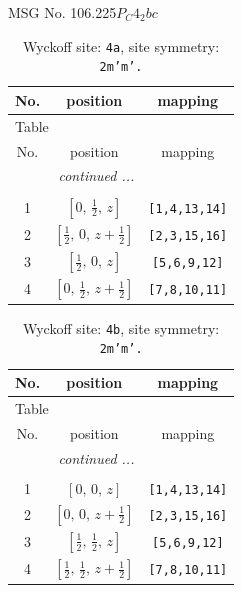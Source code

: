 \documentclass[fleqn,8pt]{jsarticle}
\begin{document}
\setcounter{MaxMatrixCols}{32}

\renewcommand{\tablename}{Table~}
\renewcommand{\figurename}{Figure~}
\begin{center}
\LARGE
MSG No. 106.225\quad$P_{C}4_{2}bc$
\end{center}
\renewcommand{\arraystretch}{1.2}
\begin{longtable}{ccc}
\caption{Wyckoff site: {\tt 4a}, site symmetry: {\tt 2m'm'.}}
 \\
 \hline \hline
No. & position & mapping \\ \hline \endfirsthead

\multicolumn{2}{l}{\tablename\ \thetable{}} \\
 \hline \hline
No. & position & mapping \\ \hline \endhead

 \hline \hline
\multicolumn{2}{r}{\footnotesize\it continued ...} \\ \endfoot

 \hline \hline
\multicolumn{2}{r}{} \\ \endlastfoot

1 & $\left[ 0,\, \frac{1}{2},\, z \right]$ & {\tt [1,4,13,14]} \\ \hline
2 & $\left[ \frac{1}{2},\, 0,\, z + \frac{1}{2} \right]$ & {\tt [2,3,15,16]} \\ \hline
3 & $\left[ \frac{1}{2},\, 0,\, z \right]$ & {\tt [5,6,9,12]} \\ \hline
4 & $\left[ 0,\, \frac{1}{2},\, z + \frac{1}{2} \right]$ & {\tt [7,8,10,11]} \\
\end{longtable}
\renewcommand{\arraystretch}{1.2}
\begin{longtable}{ccc}
\caption{Wyckoff site: {\tt 4b}, site symmetry: {\tt 2m'm'.}}
 \\
 \hline \hline
No. & position & mapping \\ \hline \endfirsthead

\multicolumn{2}{l}{\tablename\ \thetable{}} \\
 \hline \hline
No. & position & mapping \\ \hline \endhead

 \hline \hline
\multicolumn{2}{r}{\footnotesize\it continued ...} \\ \endfoot

 \hline \hline
\multicolumn{2}{r}{} \\ \endlastfoot

1 & $\left[ 0,\, 0,\, z \right]$ & {\tt [1,4,13,14]} \\ \hline
2 & $\left[ 0,\, 0,\, z + \frac{1}{2} \right]$ & {\tt [2,3,15,16]} \\ \hline
3 & $\left[ \frac{1}{2},\, \frac{1}{2},\, z \right]$ & {\tt [5,6,9,12]} \\ \hline
4 & $\left[ \frac{1}{2},\, \frac{1}{2},\, z + \frac{1}{2} \right]$ & {\tt [7,8,10,11]} \\
\end{longtable}
\end{document}
